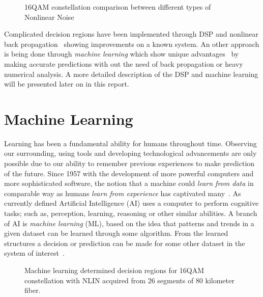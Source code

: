\begin{figure}[h!]
 \centering
{}
  \qquad
 \caption{16QAM constellation comparison between different types of Nonlinear Noise }
 \label{fig:NLPNcons}
\end{figure}
 Complicated decision regions have been implemented through DSP and nonlinear back propagation~\cite{NLPNDSP} showing improvements on a known system. An other approach is being done through \textit{machine learning} which show unique advantages~\cite{Nonparameter,Zibar:12} by making accurate predictions with out the need of back propagation or heavy numerical analysis. A more detailed description of the DSP and machine learning will be presented later on in this report.

% 	
\section{Machine Learning}
%
Learning has been a fundamental ability for humans throughout time. Observing our surrounding, using tools and developing technological advancements are only possible due to our ability to remember previous  experiences to make prediction of the future. Since 1957 with the development of more powerful computers and more sophisticated software, the notion that a machine could \emph{learn from data} in comparable way as humans\emph{ learn from experience} has captivated many~\cite{kaplan2019siri}. As currently defined Artificial Intelligence (AI) uses a computer to perform cognitive tasks; such as, perception, learning, reasoning or other similar abilities. A branch of AI is \textit{machine learning} (ML), based on the idea that patterns and trends in a given dataset can be learned through some algorithm. From the learned structures a decision or prediction can be made for some other dataset in the system of interest~\cite{marsland2014machine}.

\begin{figure}[h!]
 \centering
{}
  \qquad
 \caption{Machine learning determined decision regions for  16QAM constellation with NLIN acquired from 26 segments of 80 kilometer fiber.  }
 \label{fig:MLcons}
\end{figure}

